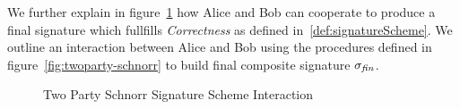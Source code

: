 We further explain in figure~\ref{fig:twoparty-schnorr-prot} how Alice and Bob can cooperate to produce a final signature which fullfills \textit{Correctness} as defined in~\ref{def:signatureScheme}.
We outline an interaction between Alice and Bob using the procedures defined in figure~\ref{fig:twoparty-schnorr} to build final composite signature $\sigma_{\mathit{fin}}$.

\begin{figure}
    \centering
    \caption{Two Party Schnorr Signature Scheme Interaction}
    \label{fig:twoparty-schnorr-prot}
\end{figure}

